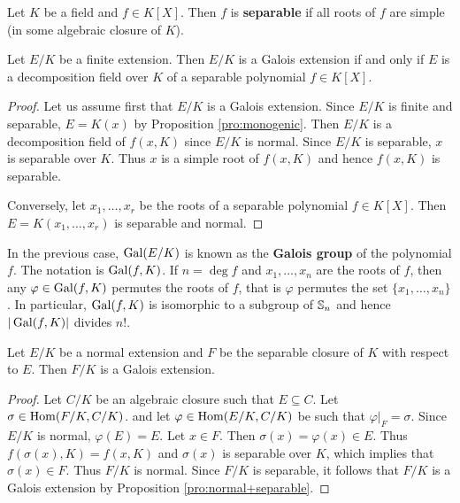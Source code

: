 \begin{definition}
Let $K$ be a field and $f\in K[X]$. Then $f$ is \textbf{separable}
if all roots of $f$ are simple (in some algebraic closure of $K$). 
\end{definition}

\begin{proposition}
    Let $E/K$ be a finite extension. Then $E/K$ is a Galois extension 
    if and only if $E$ is a decomposition field over $K$ 
    of a separable polynomial $f\in K[X]$. 
\end{proposition}

\begin{proof}
    Let us assume first that $E/K$ is a Galois extension. Since
    $E/K$ is finite and separable, $E=K(x)$ by Proposition \ref{pro:monogenic}. 
    Then $E/K$ is a decomposition field of $f(x,K)$ since
    $E/K$ is normal. Since $E/K$ is separable, $x$ is separable over $K$. Thus $x$ is 
    a simple root of $f(x,K)$ and hence $f(x,K)$ is separable. 
    
    Conversely, let $x_1,\dots,x_r$ be the roots of a separable polynomial $f\in K[X]$.
    Then $E=K(x_1,\dots,x_r)$ is separable and normal.  
\end{proof}

In the previous case, $\operatorname{Gal}(E/K)$ is known as the \textbf{Galois group}
of the polynomial $f$. The notation is $\operatorname{Gal}(f,K)$. If $n=\deg f$ and
$x_1,\dots,x_n$ are the roots of $f$, then any 
$\varphi\in\operatorname{Gal}(f,K)$ permutes the roots of $f$, that is
$\varphi$ permutes the 
set $\{x_1,\dots,x_n\}$. In particular, $\operatorname{Gal}(f,K)$ is isomorphic to a subgroup of
$\mathbb{S}_n$ and hence $|\operatorname{Gal}(f,K)|$ divides $n!$. 

\begin{proposition}
    Let $E/K$ be a normal extension and $F$ be the separable
    closure of $K$ with respect to $E$. 
    Then $F/K$ is a Galois extension.
\end{proposition}

\begin{proof} 
    Let $C/K$ be an algebraic closure such that $E\subseteq C$. Let $\sigma\in\operatorname{Hom}(F/K,C/K)$. 
    and let $\varphi\in\operatorname{Hom}(E/K,C/K)$ be such that $\varphi|_F=\sigma$. Since $E/K$ is normal, 
    $\varphi(E)=E$. Let $x\in F$. Then $\sigma(x)=\varphi(x)\in E$. Thus
    $f(\sigma(x),K)=f(x,K)$ and $\sigma(x)$ is separable over $K$, which 
    implies that $\sigma(x)\in F$. Thus $F/K$ is normal. Since $F/K$ is separable, it follows
    that $F/K$ is a Galois extension by Proposition \ref{pro:normal+separable}.
\end{proof}

